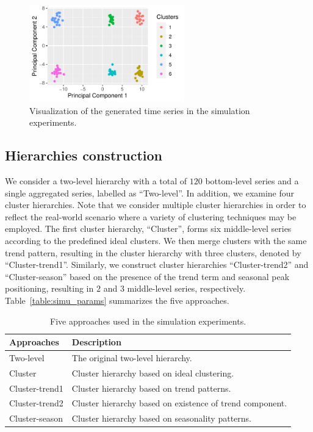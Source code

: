 \documentclass[a4paper,review,12pt,authoryear]{elsarticle}
\begin{document}
\begin{figure}
    \centering
    \includegraphics[width=0.6\textwidth]{figures/simu_pca.pdf}
    \caption{\label{fig:simu_pca}Visualization of the generated time series in the simulation experiments.}
\end{figure}

\subsection{Hierarchies construction}

We consider a two-level hierarchy with a total of $120$ bottom-level series and a single aggregated series, labelled as ``Two-level''. In addition, we examine four cluster hierarchies. Note that we consider multiple cluster hierarchies in order to reflect the real-world scenario where a variety of clustering techniques may be employed. The first cluster hierarchy, ``Cluster'', forms six middle-level series according to the predefined ideal clusters. We then merge clusters with the same trend pattern, resulting in the cluster hierarchy with three clusters, denoted by ``Cluster-trend1''. Similarly, we construct cluster hierarchies ``Cluster-trend2'' and ``Cluster-season'' based on the presence of the trend term and seasonal peak positioning, resulting in $2$ and $3$ middle-level series, respectively.
Table~\ref{table:simu_params} summarizes the five approaches.

\begin{table}[]
    \centering
    \begin{tabular}{ll}\toprule
        Approaches & Description \\ \midrule
        Two-level &  The original two-level hierarchy. \\ 
        Cluster & Cluster hierarchy based on ideal clustering. \\
        Cluster-trend1 & Cluster hierarchy based on trend patterns. \\
        Cluster-trend2 & Cluster hierarchy based on existence of trend component. \\
        Cluster-season & Cluster hierarchy based on seasonality patterns. \\\bottomrule
    \end{tabular}
    \caption{\label{tab:simu_methods}Five approaches used in the simulation experiments.}
\end{table}
\end{document}

